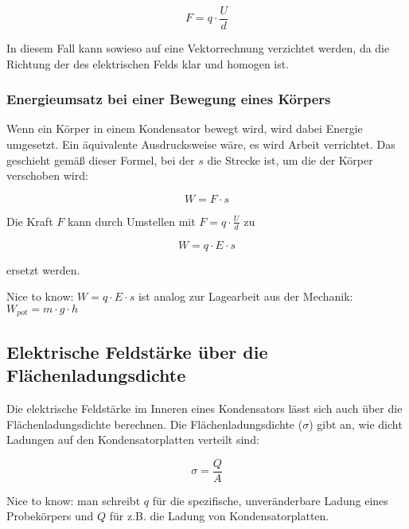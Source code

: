 \begin{equation} \label{eq:kraft_kondensator}
	F = q \cdot \frac{U}{d}
\end{equation}

In diesem Fall kann sowieso auf eine Vektorrechnung verzichtet werden, da die Richtung der des elektrischen Felds klar und homogen ist.

\subsubsection{Energieumsatz bei einer Bewegung eines Körpers}

Wenn ein Körper in einem Kondensator bewegt wird, wird dabei Energie umgesetzt. Ein äquivalente Ausdrucksweise wäre, es wird Arbeit verrichtet. Das geschieht gemäß dieser Formel, bei der $s$ die Strecke ist, um die der Körper verschoben wird:

\begin{equation} \label{eq:arbeit_kondensator}
	W = F \cdot s
\end{equation}

Die Kraft $F$ kann durch Umstellen mit $F = q \cdot \frac{U}{d}$ zu

\begin{equation} \label{eq:arbeit_kondensator_ersetzt}
	W = q \cdot E \cdot s
\end{equation}

ersetzt werden.

\begin{leftbar}
Nice to know: $W = q \cdot E \cdot s$ ist analog zur Lagearbeit aus der Mechanik: $W_{pot} = m \cdot g \cdot h$
\end{leftbar}


\subsection{Elektrische Feldstärke über die Flächenladungsdichte}

Die elektrische Feldstärke im Inneren eines Kondensators lässt sich auch über die Flächenladungsdichte berechnen. Die Flächenladungs\-dichte ($\sigma$) gibt an, wie dicht Ladungen auf den Kondensatorplatten verteilt sind:

\begin{equation} \label{eq:flaechenladungsdichte}
	\sigma = \frac{Q}{A}
\end{equation}

\begin{leftbar}
Nice to know: man schreibt $q$ für die spezifische, unveränderbare Ladung eines Probekörpers und $Q$ für z.B. die Ladung von Kondensatorplatten.
\end{leftbar}

